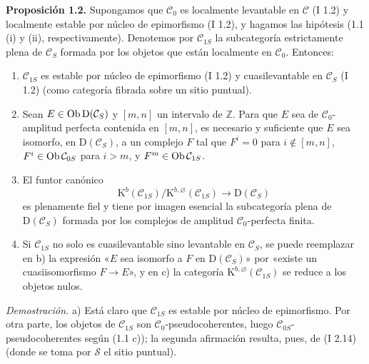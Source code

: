 \providecommand{\sisi}[2]{#2}

\textbf{Proposición 1.2.} Supongamos que $\mathcal C_0$ es localmente levantable en $\mathcal C$ (I 1.2) y localmente estable por núcleo de epimorfismo (I 1.2), y hagamos las hipótesis (1.1 (i) y (ii), respectivamente). Denotemos por $\mathcal C_{1S}$ la subcategoría estrictamente plena de $\mathcal C_S$ formada por los objetos que están localmente en $\mathcal C_0$. Entonces:
\begin{enumerate}[label=\alph*)]
\item $\mathcal C_{1S}$ es estable por núcleo de epimorfismo (I 1.2) y cuasilevantable en $\mathcal C_S$ (I 1.2) (como categoría fibrada sobre un sitio puntual).
\item Sean $E\in\operatorname{Ob}\mathrm D(\mathcal C_S)$ y $[m,n]$ un intervalo de $\mathbb Z$. Para que $E$ sea de $\mathcal C_0$-amplitud perfecta contenida en $[m,n]$, es necesario y suficiente que $E$ sea isomorfo, en $\mathrm D(\mathcal C_S)$, a un complejo $F$ tal que $F^i=0$ para $i\notin[m,n]$, $F^i\in\operatorname{Ob}\mathcal C_{0S}$ para $i>m$, y $F^m\in\operatorname{Ob}\mathcal C_{1S}$.
\item El funtor canónico
\[
\mathrm K^b(\mathcal C_{1S})/\mathrm K^{b,\varnothing}(\mathcal C_{1S})
\longrightarrow \mathrm D(\mathcal C_S)
\]
es plenamente fiel y tiene por imagen esencial la subcategoría plena de $\mathrm D(\mathcal C_S)$ formada por los complejos de amplitud $\mathcal C_0$-perfecta finita.
\item Si $\mathcal C_{1S}$ no solo es cuasilevantable sino levantable en $\mathcal C_S$, se puede reemplazar en b) la expresión «$E$ sea isomorfo a $F$ en $\mathrm D(\mathcal C_S)$» por «existe un cuasiisomorfismo $F\to E$», y en c) la categoría $\mathrm K^{b,\varnothing}(\mathcal C_{1S})$ se reduce a los objetos nulos.
\end{enumerate}

\emph{Demostración.} a) Está claro que $\mathcal C_{1S}$ es estable por núcleo de epimorfismo. Por otra parte, los objetos de $\mathcal C_{1S}$ son $\mathcal C_0$-pseudocoherentes, luego $\mathcal C_{0S}$-pseudocoherentes según (1.1 c)); la segunda afirmación resulta, pues, de (I 2.14) (donde se toma por $\sisi{S}{\mathcal S}$ el sitio puntual).

